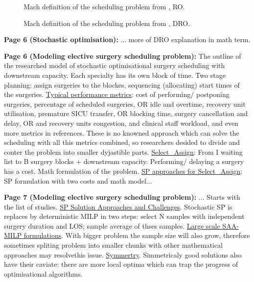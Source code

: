     \begin{figure}[H]
        \centering
        \caption{Mach definition of the scheduling problem from \cite{x335}, RO.}
        \label{fig6:SR0015US22}
    \end{figure}
    \begin{figure}[H]
        \centering
        \caption{Mach definition of the scheduling problem from \cite{x335}, DRO.}
        \label{fig7:SR0015US22}
    \end{figure}

    \textbf{Page 6 (Stochastic optimisation):}
    ... more of DRO explanation in math term.

    \textbf{Page 6 (Modeling elective surgery scheduling problem):}
    The outline of the researched model of stochastic optimisational surgery scheduling with downstream capacity. Each specialty has its own block of time. Two stage planning: assign surgeries to the blockes, sequencing (allocating) start times of the surgeries. \underline{Typical performance metrics}: cost of performing/ postponing surgeries, percentage of scheduled surgeries, OR idle and overtime, recovery unit utilisation, premature SICU transfer, OR blocking time, surgery cancellation and delay, OR and recovery units congestion, and clinical staff workload, and even more metrics in references. These is no knowned approach which can solve the scheduling with all this metrics combined, so researchers desided to divide and conter the problem into smaller dyjastible parts. \underline{Select\_Assign}: From I waiting list to B surgery blocks + downstream capacity. Performing/ delaying a surgery has a cost. Math formulation of the problem. \underline{SP approaches for Select\_Assign}: SP formulation with two costs and math model...

    \textbf{Page 7 (Modeling elective surgery scheduling problem):}
    ... Starts with the list of studies. \underline{SP Solution Approaches and Challenges}. Stochastic SP is replaces by deterministic MILP in two steps: select N samples with independent surgery duration and LOS; sample average of thses samples. \underline{Large scale SAA-MILP formulations}. With bigger problem the sample size will also grow, therefore sometimes spliting problem into smaller chunks with other mathematical approaches may resolvethis issue. \underline{Symmertry}. Simmetricaly good solutions also have their caviate: there are more local optima which can trap the progress of optimisational algorithms.
    
